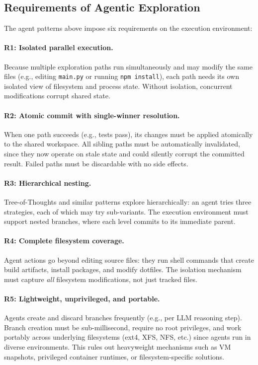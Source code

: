 \documentclass[sigconf]{acmart}
\begin{document}
\subsection{Requirements of Agentic Exploration}

The agent patterns above impose six requirements on the execution environment:

\paragraph{R1: Isolated parallel execution.}
Because multiple exploration paths run simultaneously and may modify the same files (e.g., editing \texttt{main.py} or running \texttt{npm install}), each path needs its own isolated view of filesystem and process state. Without isolation, concurrent modifications corrupt shared state.

\paragraph{R2: Atomic commit with single-winner resolution.}
When one path succeeds (e.g., tests pass), its changes must be applied atomically to the shared workspace. All sibling paths must be automatically invalidated, since they now operate on stale state and could silently corrupt the committed result. Failed paths must be discardable with no side effects.

\paragraph{R3: Hierarchical nesting.}
Tree-of-Thoughts and similar patterns explore hierarchically: an agent tries three strategies, each of which may try sub-variants. The execution environment must support nested branches, where each level commits to its immediate parent.

\paragraph{R4: Complete filesystem coverage.}
Agent actions go beyond editing source files: they run shell commands that create build artifacts, install packages, and modify dotfiles. The isolation mechanism must capture \emph{all} filesystem modifications, not just tracked files.

\paragraph{R5: Lightweight, unprivileged, and portable.}
Agents create and discard branches frequently (e.g., per LLM reasoning step). Branch creation must be sub-millisecond, require no root privileges, and work portably across underlying filesystems (ext4, XFS, NFS, etc.) since agents run in diverse environments. This rules out heavyweight mechanisms such as VM snapshots, privileged container runtimes, or filesystem-specific solutions.
\end{document}
